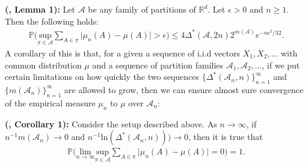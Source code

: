 \documentclass{report}
\begin{document}
\noindent\textbf{(\cite{Consistency}, Lemma 1): }Let $\mathcal{A}$ be any family of partitions of $\mathbb{R}^d$. Let $\epsilon > 0$ and $n \geq 1$. Then the following holds:
\begin{align*}
	\mathbb{P}\bigg( \underset{\pi \in \mathcal{A}}{\text{sup}}\sum_{A \in \pi} \big|\mu_n(A) - \mu(A)\big| > \epsilon \bigg) \leq 4 \Delta^*(\mathcal{A}, 2n)2^{m(\mathcal{A})} e^{-n\epsilon^2/32}.
\end{align*}
A corollary of this is that, for a given a sequence of i.i.d vectors $X_1,X_2,\dots$ with common distribution $\mu$ 
 and a sequence of partition families $\mathcal{A}_1,\mathcal{A}_2,\dots$, if we put certain limitations on how quickly
the two sequences $\{\Delta^*(\mathcal{A}_n,n)\}_{n=1}^\infty$ and $\{m(\mathcal{A}_n)\}_{n=1}^\infty$ are allowed to grow, then we can ensure almost sure convergence of the empirical measure $\mu_n$ to $\mu$
over $\mathcal{A}_n$:\newline

\noindent\textbf{(\cite{Consistency}, Corollary 1): }Consider the setup described above. As $n \rightarrow \infty$, if $n^{-1}m(\mathcal{A}_n) \rightarrow 0$ and
$n^{-1}\text{ln}(\Delta^*(\mathcal{A}_n,n))) \rightarrow 0$, then it is true that
\begin{align*}
	\mathbb{P}\bigg( \underset{n \rightarrow \infty}{\text{lim}}
	\underset{\pi \in \mathcal{A}}{\text{sup}}\sum_{A \in \pi} \big|\mu_n(A) - \mu(A)\big| = 0 \bigg) = 1.
\end{align*}
\end{document}
